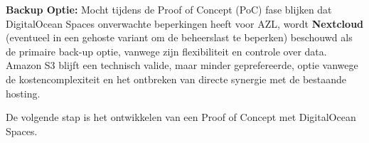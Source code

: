 \textbf{Backup Optie:}
Mocht tijdens de Proof of Concept (PoC) fase blijken dat DigitalOcean Spaces onverwachte beperkingen heeft voor AZL, wordt \textbf{Nextcloud} (eventueel in een gehoste variant om de beheerslast te beperken) beschouwd als de primaire back-up optie, vanwege zijn flexibiliteit en controle over data. Amazon S3 blijft een technisch valide, maar minder geprefereerde, optie vanwege de kostencomplexiteit en het ontbreken van directe synergie met de bestaande hosting.

De volgende stap is het ontwikkelen van een Proof of Concept met DigitalOcean Spaces.

